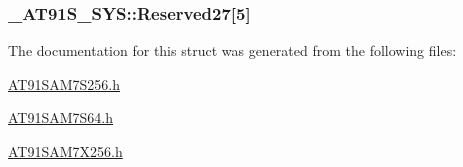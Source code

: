 \hypertarget{struct__AT91S__SYS_ef0b46867c98e9c7fcc879157a879d0c}{
\subsubsection{ {\bf \_\-AT91S\_\-SYS::Reserved27}\mbox{[}5\mbox{]}}}
\label{struct__AT91S__SYS_ef0b46867c98e9c7fcc879157a879d0c}




The documentation for this struct was generated from the following files:\begin{CompactItemize}
\item 
\hyperlink{AT91SAM7S256_8h}{AT91SAM7S256.h}\item 
\hyperlink{AT91SAM7S64_8h}{AT91SAM7S64.h}\item 
\hyperlink{AT91SAM7X256_8h}{AT91SAM7X256.h}\end{CompactItemize}
